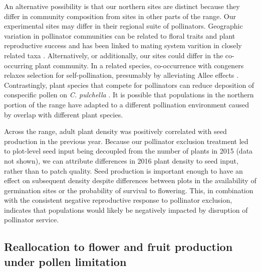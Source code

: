 \documentclass{article}
\begin{document}
An alternative possibility is that our northern sites are distinct because they differ in community composition from sites in other parts of the range. Our experimental sites may differ in their regional suite of pollinators. Geographic variation in pollinator communities can be related to floral traits \citep{nattero2007geographical} and plant reproductive success \citep{gomez2007pollinator} and has been linked to mating system varition in closely related taxa \citep{moeller2006geographic}. Alternatively, or additionally, our sites could differ in the co-occurring plant community. In a related species, co-occurrence with congeners relaxes selection for self-pollination, presumably by alleviating Allee effects \citep{moeller2005ecologicalcontext}. Contrastingly, plant species that compete for pollinators can reduce deposition of conspecific pollen on \textit{C. pulchella} \citep{palladini2013indirect}. It is possible that populations in the northern portion of the range have adapted to a different pollination environment caused by overlap with different plant species.

Across the range, adult plant density was positively correlated with seed production in the previous year. Because our pollinator exclusion treatment led to plot-level seed input being decoupled from the number of plants in 2015 (data not shown), we can attribute differences in 2016 plant density to seed input, rather than to patch quality. Seed production is important enough to have an effect on subsequent density despite differences between plots in the availability of germination sites or the probability of survival to flowering. This, in combination with the consistent negative reproductive response to pollinator exclusion, indicates that populations would likely be negatively impacted by disruption of pollinator service. 

\subsection*{Reallocation to flower and fruit production under pollen limitation}
\end{document}
